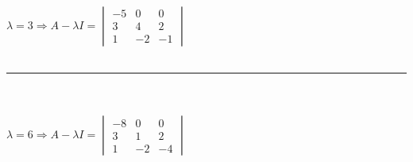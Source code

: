 \documentclass[fleqn]{article}
\begin{document}
\begin{enumerate}
{          \\
          $
            \lambda=3 \Longrightarrow A-\lambda I=\begin{vmatrix}
              -5 & 0 & 0
              \\
              3 & 4 & 2
              \\
              1 & -2 & -1
            \end{vmatrix}
          $
          \\
          \\
          \rule{15cm}{1pt}
          \\
          \\
          $
            \lambda=6 \Longrightarrow A-\lambda I=\begin{vmatrix}
              -8 & 0 & 0
              \\
              3 & 1 & 2
              \\
              1 & -2 & -4
            \end{vmatrix}
          $
        }


  \end{enumerate}
\end{document}
